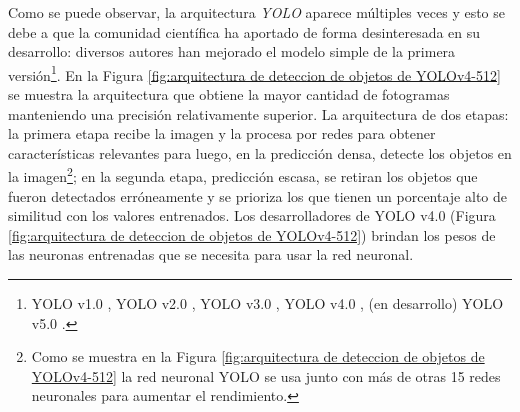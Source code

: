 

Como se puede observar, la arquitectura \textit{YOLO} aparece múltiples veces y esto se debe a que la comunidad científica ha aportado de forma desinteresada en su desarrollo: diversos autores han mejorado el modelo simple de la primera versión\footnote{YOLO v1.0 \cite{Redmon2016}, YOLO v2.0 \cite{Redmon2017}, YOLO v3.0 \cite{Redmon2018}, YOLO v4.0 \cite{Solawetz2020}, (en desarrollo) YOLO v5.0 \cite{bochkovskiy2020yolov4}.}. En la Figura \ref{fig:arquitectura de deteccion de objetos de YOLOv4-512} se muestra la arquitectura que obtiene la mayor cantidad de fotogramas manteniendo una precisión relativamente superior. La arquitectura de dos etapas: la primera etapa recibe la imagen y la procesa por redes para obtener características relevantes para luego, en la predicción densa, detecte los objetos en la imagen\footnote{Como se muestra en la Figura \ref{fig:arquitectura de deteccion de objetos de YOLOv4-512} la red neuronal YOLO se usa junto con más de otras 15 redes neuronales para aumentar el rendimiento.}; en la segunda etapa, predicción escasa, se retiran los objetos que fueron detectados erróneamente y se prioriza los que tienen un porcentaje alto de similitud con los valores entrenados. Los desarrolladores de YOLO v4.0 (Figura \ref{fig:arquitectura de deteccion de objetos de YOLOv4-512}) brindan los pesos de las neuronas entrenadas que se necesita para usar la red neuronal.

